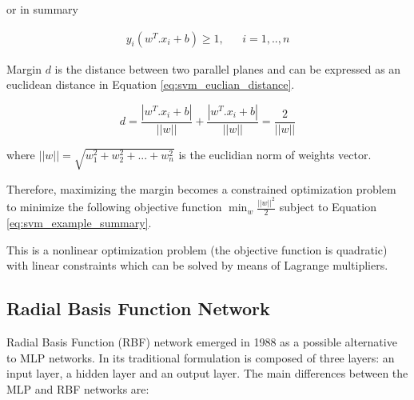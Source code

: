or in summary

\begin{eqnarray}
\label{eq:svm_example_summary}
y_i (w^T.x_i + b) \geq 1 ,&& i=1,..,n
\end{eqnarray}

Margin $d$ is the distance between two parallel planes and can be expressed as an euclidean distance in Equation \ref{eq:svm_euclian_distance}.

\begin{equation}
\label{eq:svm_euclian_distance}
d = \frac{| w^T.x_i + b |}{|| w ||} + \frac{| w^T.x_i + b |}{|| w ||} = \frac{2}{|| w ||}
\end{equation}

where $||w|| = \sqrt{w_1^2 + w_2^2 + ... + w_n^2}$ is the euclidian norm of weights vector.

Therefore, maximizing the margin becomes a constrained optimization problem to minimize the following objective function $\min_w \frac{||w||^2}{2}$ subject to Equation \ref{eq:svm_example_summary}.

This is a nonlinear optimization problem (the objective function is quadratic) with linear constraints which can be solved by means of Lagrange multipliers.

\subsection{Radial Basis Function Network}

Radial Basis Function (RBF) network emerged in 1988 as a possible alternative to MLP networks. In its traditional formulation is composed of three layers: an input layer, a hidden layer and an output layer. The main differences between the MLP and RBF networks are:

